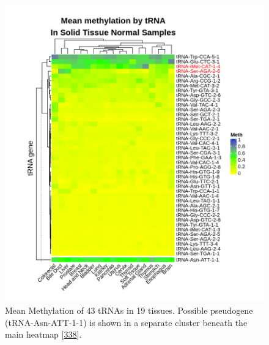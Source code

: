 \documentclass[
]{book}
\begin{document}
\begin{figure}

{\centering \includegraphics[width=0.9\linewidth]{./figs/meanBetasByTissueTNMpseudoSplitHeatmap} 

}

\caption{Mean Methylation of 43 tRNAs in 19 tissues. Possible pseudogene (tRNA-Asn-ATT-1-1) is shown in a separate cluster beneath the main heatmap {[}\protect\hyperlink{ref-Gu2016}{338}{]}.}\label{fig:meanBetasByTissueTNMHeatmap}
\end{figure}
\end{document}
